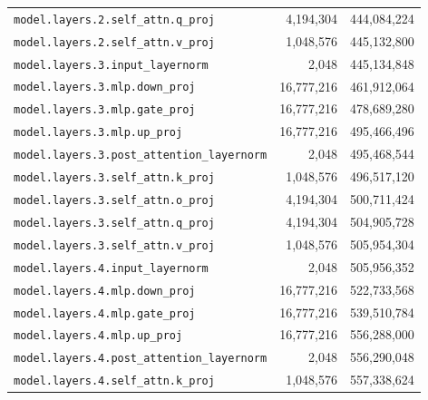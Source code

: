 \documentclass[10pt,a4paper]{article}
\theoremstyle{definition}
\begin{document}
\begin{appendices}
\begin{longtable}{p{9.5cm}rr}
\texttt{model.\allowbreak{}layers.\allowbreak{}2.\allowbreak{}self\_attn.\allowbreak{}q\_proj} & 4,194,304 & 444,084,224 \\
\texttt{model.\allowbreak{}layers.\allowbreak{}2.\allowbreak{}self\_attn.\allowbreak{}v\_proj} & 1,048,576 & 445,132,800 \\
\texttt{model.\allowbreak{}layers.\allowbreak{}3.\allowbreak{}input\_layernorm} & 2,048 & 445,134,848 \\
\texttt{model.\allowbreak{}layers.\allowbreak{}3.\allowbreak{}mlp.\allowbreak{}down\_proj} & 16,777,216 & 461,912,064 \\
\texttt{model.\allowbreak{}layers.\allowbreak{}3.\allowbreak{}mlp.\allowbreak{}gate\_proj} & 16,777,216 & 478,689,280 \\
\texttt{model.\allowbreak{}layers.\allowbreak{}3.\allowbreak{}mlp.\allowbreak{}up\_proj} & 16,777,216 & 495,466,496 \\
\texttt{model.\allowbreak{}layers.\allowbreak{}3.\allowbreak{}post\_attention\_layernorm} & 2,048 & 495,468,544 \\
\texttt{model.\allowbreak{}layers.\allowbreak{}3.\allowbreak{}self\_attn.\allowbreak{}k\_proj} & 1,048,576 & 496,517,120 \\
\texttt{model.\allowbreak{}layers.\allowbreak{}3.\allowbreak{}self\_attn.\allowbreak{}o\_proj} & 4,194,304 & 500,711,424 \\
\texttt{model.\allowbreak{}layers.\allowbreak{}3.\allowbreak{}self\_attn.\allowbreak{}q\_proj} & 4,194,304 & 504,905,728 \\
\texttt{model.\allowbreak{}layers.\allowbreak{}3.\allowbreak{}self\_attn.\allowbreak{}v\_proj} & 1,048,576 & 505,954,304 \\
\texttt{model.\allowbreak{}layers.\allowbreak{}4.\allowbreak{}input\_layernorm} & 2,048 & 505,956,352 \\
\texttt{model.\allowbreak{}layers.\allowbreak{}4.\allowbreak{}mlp.\allowbreak{}down\_proj} & 16,777,216 & 522,733,568 \\
\texttt{model.\allowbreak{}layers.\allowbreak{}4.\allowbreak{}mlp.\allowbreak{}gate\_proj} & 16,777,216 & 539,510,784 \\
\texttt{model.\allowbreak{}layers.\allowbreak{}4.\allowbreak{}mlp.\allowbreak{}up\_proj} & 16,777,216 & 556,288,000 \\
\texttt{model.\allowbreak{}layers.\allowbreak{}4.\allowbreak{}post\_attention\_layernorm} & 2,048 & 556,290,048 \\
\texttt{model.\allowbreak{}layers.\allowbreak{}4.\allowbreak{}self\_attn.\allowbreak{}k\_proj} & 1,048,576 & 557,338,624 \\

\end{longtable}
\end{appendices}
\end{document}

